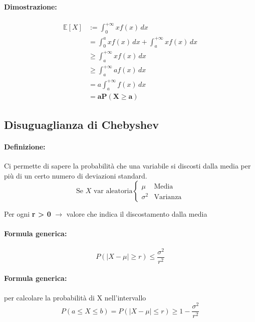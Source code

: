 \documentclass[]{article}
\newcommand{\ev}{\mathbb{E}[X]}
\renewcommand{\ev}[1]{\mathbb{E}[#1]}
\newcommand{\definizione}{\paragraph{Definizione:}}
\newcommand{\formula}{\paragraph{Formula generica:}}
\begin{document}
    \paragraph{Dimostrazione:}
    \begin{equation*}
        \begin{split}
            \ev{X} & := \int_{0}^{+\infty} xf(x) \, dx \\
            & = \int_{0}^{a} x f(x) \, dx + \int_{a}^{+\infty} x f(x) \, dx \\ 
            & \geq \int_{a}^{+\infty} x f(x) \, dx \\ 
            & \geq \int_{a}^{+\infty} a f(x) \, dx \\
            & = a \int_{a}^{+\infty} f(x) \, dx \\ 
            & = \boldsymbol{aP(X \geq a)}
        \end{split}
    \end{equation*}
    
    \subsection{Disuguaglianza di Chebyshev}
    \definizione Ci permette di sapere la probabilità che una variabile si discosti dalla media per più di un certo numero di deviazioni standard.
    \begin{equation*}
        \text{Se } X \text{ var aleatoria}
        \begin{cases}
            \mu & \text{Media} \\
            \sigma^2 & \text{Varianza}
        \end{cases}
    \end{equation*}

    \centerline{Per ogni \textbf{r > 0} $\longrightarrow$ valore che indica il discostamento dalla media}
    \formula 
    \[ P(|X - \mu| \geq r) \leq \frac{\sigma^2}{r^2} \]
    \formula per calcolare la probabilità di X nell'intervallo
    \[ P(a \leq X \leq b) = P(|X - \mu| \leq r) \geq 1 - \frac{\sigma^2}{r^2} \]
\end{document}
